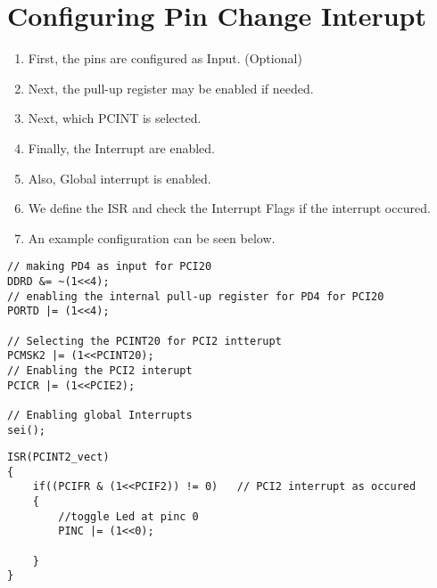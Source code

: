 \section{Configuring Pin Change Interupt}
\begin{enumerate}[label=(\Roman*)]
    \item First, the  pins are configured as Input. (Optional)
    \item Next, the pull-up register may be enabled if needed.
    \item Next, which PCINT is selected.
    \item Finally, the Interrupt are enabled.
    \item Also, Global interrupt is enabled.
    \item We define the ISR and check the Interrupt Flags if the interrupt occured.
    \item An example configuration can be seen below.
\end{enumerate}

\begin{minipage}{0.5\textwidth}
\begin{verbatim}
// making PD4 as input for PCI20
DDRD &= ~(1<<4);
// enabling the internal pull-up register for PD4 for PCI20
PORTD |= (1<<4);

// Selecting the PCINT20 for PCI2 intterupt
PCMSK2 |= (1<<PCINT20);
// Enabling the PCI2 interupt
PCICR |= (1<<PCIE2);

// Enabling global Interrupts
sei();	
\end{verbatim}
\end{minipage}
\begin{minipage}{0.45\textwidth}
\begin{verbatim}
ISR(PCINT2_vect)
{
    if((PCIFR & (1<<PCIF2)) != 0)	// PCI2 interrupt as occured
    {		
        //toggle Led at pinc 0
        PINC |= (1<<0);

    }
}
\end{verbatim}
\end{minipage}



% 

